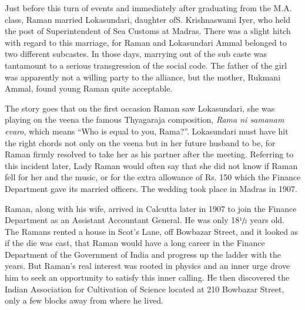 Just before this turn of events and immediately after graduating from the M.A. class, Raman married Lokasundari, daughter of\break S. Krishnaswami Iyer, who held the post of Superintendent of Sea Customs at Madras. There was a slight hitch with regard to this marriage, for Raman and Lokasundari Ammal belonged to two different subcastes. In those days, marrying out of the sub caste was tantamount to a serious transgression of the social code. The father of the girl was apparently not a willing party to the alliance, but the mother, Rukmani Ammal, found young Raman quite acceptable.

The story goes that on the first occasion Raman saw \hbox{Lokasundari}, she was playing on the veena the famous Thyagaraja composition, {\em Rama ni samanam evaro}, which means ``Who is equal to you, Rama?''. Lokasundari must have hit the right chords not only on the veena but in her future husband to be, for Raman firmly resolved to take her as his partner after the meeting. Referring to this incident later, Lady Raman would often say that she did not know if Raman fell for her and the music, or for the extra allowance of Rs. 150 which the Finance Department gave its married officers. The wedding took place in Madras in 1907.

Raman, along with his wife, arrived in Calcutta later in 1907
to join the Finance Department as an Assistant Accountant
General. He was only 18$\sfrac{1}{2}$ years old. The Ramans rented a house
in Scot's Lane, off Bowbazar Street, and it looked as if the die
was cast, that Raman would have a long career in the Finance
Department of the Government of India and progress up the
ladder with the years. But Raman's real interest was rooted in
physics and an inner urge drove him to seek an opportunity to
satisfy this inner calling. He then discovered the Indian
Association for Cultivation of Science located at 210 Bowbazar
Street, only a few blocks away from where he lived.

\smallskip
{}



